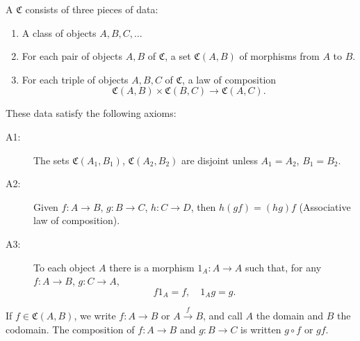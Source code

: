 A  $\mathfrak{C}$ consists of three pieces of data:
\begin{enumerate}
\item[(1)] A class of objects $A, B, C, \ldots$
\item[(2)] For each pair of objects $A, B$ of $\mathfrak{C}$, a set $\mathfrak{C}(A, B)$ of morphisms from $A$ to $B$.
\item[(3)] For each triple of objects $A, B, C$ of $\mathfrak{C}$, a law of composition
$$\mathfrak{C}(A, B) \times \mathfrak{C}(B, C) \to \mathfrak{C}(A, C).$$
\end{enumerate}
These data satisfy the following axioms:
\begin{description}
\item[A1:] The sets $\mathfrak{C}(A_1, B_1)$, $\mathfrak{C}(A_2, B_2)$ are disjoint unless $A_1 = A_2$, $B_1 = B_2$.
\item[A2:] Given $f: A \to B$, $g: B \to C$, $h: C \to D$, then $h(gf) = (hg)f$ (Associative law of composition).
\item[A3:] To each object $A$ there is a morphism $1_A: A \to A$ such that, for any $f: A \to B$, $g: C \to A$,
$$f 1_A = f, \quad 1_A g = g.$$
\end{description}
If $f \in \mathfrak{C}(A, B)$, we write $f: A \to B$ or $A \xrightarrow{f} B$, and call $A$ the domain and $B$ the codomain. The composition of $f: A \to B$ and $g: B \to C$ is written $g \circ f$ or $g f$.
